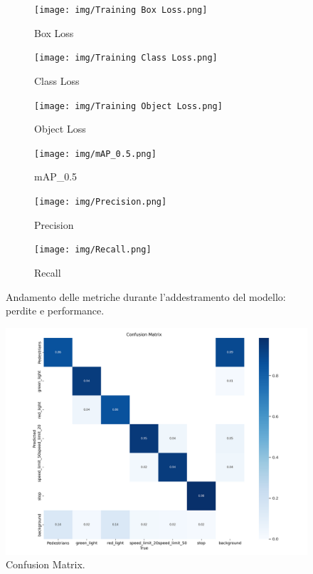 \documentclass{article}
\begin{document}
\begin{figure}[h!]
  \centering
  \captionsetup[subfigure]{labelformat=parens, labelsep=space}

  \begin{subfigure}[b]{0.495\textwidth}
    \centering
    \texttt{[image: img/Training Box Loss.png]}
    \caption{Box Loss}
    \label{fig:boxloss}
  \end{subfigure}
  \begin{subfigure}[b]{0.495\textwidth}
    \centering
    \texttt{[image: img/Training Class Loss.png]}
    \caption{Class Loss}
    \label{fig:classloss}
  \end{subfigure}

  \vspace{0.6em}

  \begin{subfigure}[b]{0.495\textwidth}
    \centering
    \texttt{[image: img/Training Object Loss.png]}
    \caption{Object Loss}
    \label{fig:objectloss}
  \end{subfigure}
  \begin{subfigure}[b]{0.495\textwidth}
    \centering
    \texttt{[image: img/mAP\_0.5.png]}
    \caption{mAP\_0.5}
    \label{fig:map}
  \end{subfigure}

  \vspace{0.6em}

  \begin{subfigure}[b]{0.495\textwidth}
    \centering
    \texttt{[image: img/Precision.png]}
    \caption{Precision}
    \label{fig:precision}
  \end{subfigure}
  \begin{subfigure}[b]{0.495\textwidth}
    \centering
    \texttt{[image: img/Recall.png]}
    \caption{Recall}
    \label{fig:recall}
  \end{subfigure}

  \caption{Andamento delle metriche durante l’addestramento del modello: perdite e performance.}
  \label{fig:training_metrics}
\end{figure}

\begin{figure}[h!]
    \centering
    \includegraphics[width=0.9\linewidth]{img/confusion_matrix.png}
    \caption{Confusion Matrix.}
\end{figure}
\end{document}
